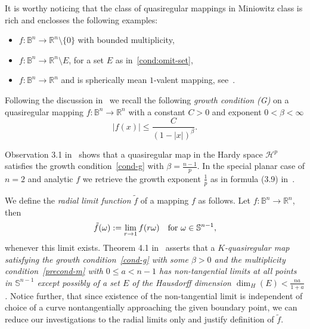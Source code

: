 \documentclass[11pt,a4paper,reqno]{amsart}
\theoremstyle{definition}
\newcommand{\om}{\omega}
\newcommand{\B}{\mathbb{B}^n}
\newcommand{\Rn}{{\mathbb R}^n}
\newcommand{\Hp}{\mathcal{H}^p}
\newcommand{\Sn}{\mathbb{S}^{n-1}}
\numberwithin{komcounter}{section}
\begin{document}
It is worthy noticing that the class of quasiregular mappings in Miniowitz class is rich and enclosses the following examples:
\begin{itemize}
\item[(1)] $f:\B\to \Rn\setminus \{0\}$ with bounded multiplicity,
\item[(2)] $f:\B\to \Rn\setminus E$, for a set $E$ as in~\eqref{cond:omit-set},
\item[(3)] $f:\B\to \Rn$ and is spherically mean $1$-valent mapping, see~\cite{M1}.
\end{itemize}
\smallskip

 Following the discussion in~\cite{ag2} we recall the following \emph{growth condition (G)} on a quasiregular mapping $f:\B\to \Rn$ with a constant $C>0$ and exponent $0<\beta<\infty$
\begin{equation}\label{cond-g}\tag{G}
 |f(x)|\leq \frac{C}{(1-|x|)^{\beta}}.
\end{equation}

Observation 3.1 in~\cite{ag2} shows that a quasiregular map in the Hardy space $\Hp$ satisfies the growth condition~\eqref{cond-g} with $\beta=\frac{n-1}{p}$. In the special planar case of $n=2$ and analytic $f$ we retrieve the growth exponent $\frac1p$ as in formula (3.9) in~\cite[Chapter I.3]{g}.
\smallskip

 We define the \emph{radial limit function} $\tilde{f}$ of a mapping $f$ as follows. Let $f:\B\to \Rn$, then
\[
 \tilde{f}(\om):=\lim_{r\to 1} f(r\om) \quad\hbox{for }\om\in \Sn,
\]
whenever this limit exists. Theorem 4.1 in~\cite{kmv} asserts that a \emph{$K$-quasiregular map satisfying the growth condition~\eqref{cond-g} with some $\beta>0$ and the multiplicity condition~\eqref{precond-m} with $0\leq a< n-1$ has non-tangential limits at all points in $\Sn$ except possibly of a set $E$ of the Hausdorff dimension $\dim_{H}(E)<\frac{na}{1+a}$.} Notice further, that since existence of the non-tangential limit is independent of choice of a curve nontangentially approaching the given boundary point,  we can reduce our investigations to the radial limits only and justify definition of $\tilde{f}$.
\smallskip
\end{document}
